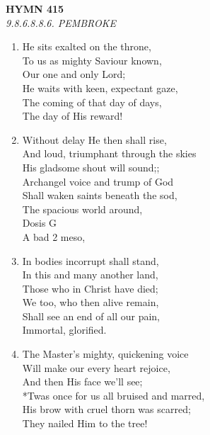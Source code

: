 \documentclass[11pt,a4paper]{article}
\begin{document}
\newpage
\begin{center}
    {\Large \textbf{HYMN 415}}
    \\
    \textit{9.8.6.8.8.6. PEMBROKE}
\end{center}
\vspace{1em}

\begin{enumerate}
    \item He sits exalted on the throne, \\
        To us as mighty Saviour known, \\
        Our one and only Lord; \\
        He waits with keen, expectant gaze, \\
        The coming of that day of days, \\
        The day of His reward!

    \item Without delay He then shall rise, \\
        And loud, triumphant through the skies \\
        His gladsome shout will sound;; \\
        Archangel voice and trump of God \\
        Shall waken saints beneath the sod, \\
        The spacious world around, \\
        Dosis G \\
        A bad 2 meso,

    \item In bodies incorrupt shall stand, \\
        In this and many another land, \\
        Those who in Christ have died; \\
        We too, who then alive remain, \\
        Shall see an end of all our pain, \\
        Immortal, glorified.

    \item The Master's mighty, quickening voice \\
        Will make our every heart rejoice, \\
        And then His face we'll see; \\
        *Twas once for us all bruised and marred, \\
        His brow with cruel thorn was scarred; \\
        They nailed Him to the tree!


\end{enumerate}
\end{document}
